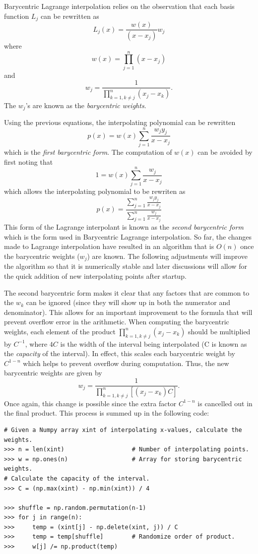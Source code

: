 Barycentric Lagrange interpolation relies on the observation that each basis function $L_j$ can be rewritten as
\[
L_j(x) = \frac{w(x)}{(x-x_j)}w_j
\]
where 
\[
w(x) = \prod_{j=1}^n (x-x_j)
\]
and
\[
w_j = \frac{1}{\prod_{k=1, k \neq j}^n (x_j-x_k)}.
\]
The $w_j$'s are known as the \emph{barycentric weights}.

Using the previous equations, the interpolating polynomial can be rewritten
\[
p(x) = w(x) \sum_{j=1}^n \frac{w_j y_j}{x-x_j}
\]
which is the \emph{first barycentric form}.
The computation of $w(x)$ can be avoided by first noting that
\[
1 = w(x) \sum_{j=1}^n \frac{w_j}{x-x_j}
\]
which allows the interpolating polynomial to be rewriten as
\[
p(x) = \frac{\displaystyle\sum_{j=1}^n \frac{w_j y_j}{x-x_j}}{\displaystyle\sum_{j=1}^n \frac{w_j}{x-x_j}}
\]
This form of the Lagrange interpolant is known as the \emph{second barycentric form} which is the form used in Barycentric Lagrange interpolation.
So far, the changes made to Lagrange interpolation have resulted in an algorithm that is $O(n)$ once the barycentric weights ($w_j$) are known.
The following adjustments will improve the algorithm so that it is numerically stable and later discussions will allow for the quick addition of new interpolating points after startup.

The second barycentric form makes it clear that any factors that are common to the $w_k$ can be ignored (since they will show up in both the numerator and denominator).
This allows for an important improvement to the formula that will prevent overflow error in the arithmetic.
When computing the barycentric weights, each element of the product $\prod_{k=1, k \neq j}^n (x_j-x_k)$ should be multiplied by $C^{-1}$, where $4C$ is the width of the interval being interpolated 
(C is known as the \emph{capacity} of the interval).
In effect, this scales each barycentric weight by $C^{1-n}$ which helps to prevent overflow during computation.
Thus, the new barycentric weights are given by
\[
w_j = \frac{1}{\prod_{k=1, k \neq j}^n \left[(x_j-x_k)C\right]}.
\]
Once again, this change is possible since the extra factor $C^{1-n}$ is cancelled out in the final product.
This process is summed up in the following code:

\begin{lstlisting}
# Given a Numpy array xint of interpolating x-values, calculate the weights.
>>> n = len(xint)                   # Number of interpolating points.
>>> w = np.ones(n)                  # Array for storing barycentric weights.
# Calculate the capacity of the interval.
>>> C = (np.max(xint) - np.min(xint)) / 4
    
>>> shuffle = np.random.permutation(n-1)
>>> for j in range(n):
>>>     temp = (xint[j] - np.delete(xint, j)) / C
>>>     temp = temp[shuffle]        # Randomize order of product.
>>>     w[j] /= np.product(temp)
\end{lstlisting}

